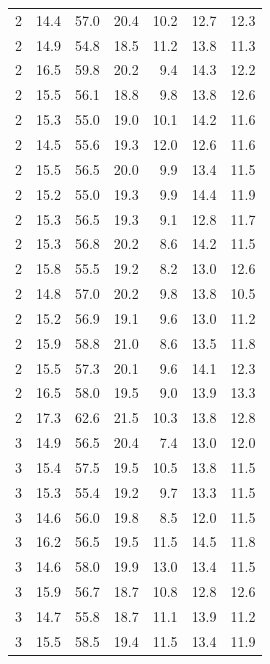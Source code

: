 \begin{center}
\begin{supertabular}{rrrrrrr}
      2     & 14.4 & 57.0   & 20.4  & 10.2  & 12.7  & 12.3  \\
      2     & 14.9 & 54.8   & 18.5  & 11.2  & 13.8  & 11.3  \\
      2     & 16.5 & 59.8   & 20.2  &  9.4  & 14.3  & 12.2  \\
      2     & 15.5 & 56.1   & 18.8  &  9.8  & 13.8  & 12.6  \\
      2     & 15.3 & 55.0   & 19.0  & 10.1  & 14.2  & 11.6  \\
      2     & 14.5 & 55.6   & 19.3  & 12.0  & 12.6  & 11.6  \\
      2     & 15.5 & 56.5   & 20.0  &  9.9  & 13.4  & 11.5  \\
      2     & 15.2 & 55.0   & 19.3  &  9.9  & 14.4  & 11.9  \\
      2     & 15.3 & 56.5   & 19.3  &  9.1  & 12.8  & 11.7  \\
      2     & 15.3 & 56.8   & 20.2  &  8.6  & 14.2  & 11.5  \\
      2     & 15.8 & 55.5   & 19.2  &  8.2  & 13.0  & 12.6  \\
      2     & 14.8 & 57.0   & 20.2  &  9.8  & 13.8  & 10.5  \\
      2     & 15.2 & 56.9   & 19.1  &  9.6  & 13.0  & 11.2  \\
      2     & 15.9 & 58.8   & 21.0  &  8.6  & 13.5  & 11.8  \\
      2     & 15.5 & 57.3   & 20.1  &  9.6  & 14.1  & 12.3  \\
      2     & 16.5 & 58.0   & 19.5  &  9.0  & 13.9  & 13.3  \\
      2     & 17.3 & 62.6   & 21.5  & 10.3  & 13.8  & 12.8  \\
      3     & 14.9 & 56.5   & 20.4  &  7.4  & 13.0  & 12.0  \\
      3     & 15.4 & 57.5   & 19.5  & 10.5  & 13.8  & 11.5  \\
      3     & 15.3 & 55.4   & 19.2  &  9.7  & 13.3  & 11.5  \\
      3     & 14.6 & 56.0   & 19.8  &  8.5  & 12.0  & 11.5  \\
      3     & 16.2 & 56.5   & 19.5  & 11.5  & 14.5  & 11.8  \\
      3     & 14.6 & 58.0   & 19.9  & 13.0  & 13.4  & 11.5  \\
      3     & 15.9 & 56.7   & 18.7  & 10.8  & 12.8  & 12.6  \\
      3     & 14.7 & 55.8   & 18.7  & 11.1  & 13.9  & 11.2  \\
      3     & 15.5 & 58.5   & 19.4  & 11.5  & 13.4  & 11.9  \\

\end{supertabular}
\end{center}
